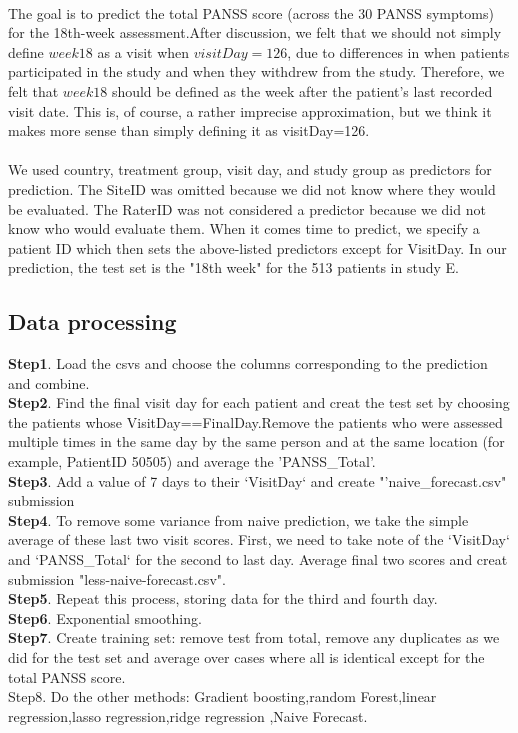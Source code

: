 \documentclass{article}
\begin{document}
	\paragraph{} The goal is to predict the total PANSS score (across the 30 PANSS symptoms) for the 18th-week assessment.After discussion, we felt that we should not simply define $week 18$ as a visit when $visitDay=126$, due to differences in when patients participated in the study and when they withdrew from the study. Therefore, we felt that $week 18$ should be defined as the week after the patient's last recorded visit date. This is, of course, a rather imprecise approximation, but we think it makes more sense than simply defining it as visitDay=126. 
	\paragraph{} We used country, treatment group, visit day, and study group as predictors for prediction. The SiteID was omitted because we did not know where they would be evaluated. The RaterID was not considered a predictor because we did not know who would evaluate them. When it comes time to predict, we specify a patient ID which then sets the above-listed predictors except for VisitDay. In our prediction, the test set is the "18th week" for the 513 patients in study E.
	\subsection{Data processing}
	 \textbf{Step1}. Load the csvs and choose the columns corresponding to the prediction and combine. \\
	\textbf{Step2}. Find the final visit day for each patient and creat the test set by choosing the patients whose VisitDay==FinalDay.Remove the patients who were assessed multiple times in the same day by the same person and at the same location (for example, PatientID 50505) and average the 'PANSS\_Total'.\\
	\textbf{Step3}. Add a value of 7 days to their `VisitDay` and create "'naive\_forecast.csv" submission\\
	\textbf{Step4}. To remove some variance from naive prediction, we take the simple average of these last two visit scores. First, we need to take note of the `VisitDay` and `PANSS\_Total` for the second to last day. Average final two scores and creat submission "less-naive-forecast.csv". \\
	\textbf{Step5}. Repeat this process, storing data for the third and fourth day.\\
	\textbf{Step6}. Exponential smoothing.	\\
    \textbf{Step7}. Create training set: remove test from total, remove any duplicates as we did for the test set and average over cases where all is identical except for the total PANSS score.\\
    Step8. Do the other methods: Gradient boosting,random Forest,linear regression,lasso regression,ridge regression
	,Naive Forecast.
\end{document}
